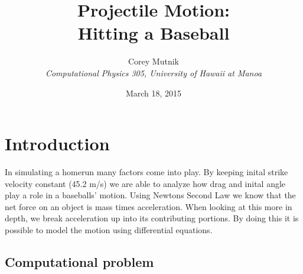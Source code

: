 \documentclass[11pt]{article}
\begin{document}
\pagestyle{myheadings}


\title{Projectile Motion:\\
Hitting a Baseball}


\author{Corey Mutnik \\
{\it Computational Physics 305, University of Hawaii at Manoa} }


\date{March 18, 2015}

\maketitle   





\section{Introduction}


In simulating a homerun many factors come into play.  By keeping inital strike velocity constant (45.2 m/s) we are able to 
analyze how drag and inital angle play a role in a baseballs' motion.  
Using Newtons Second Law we know that the net force on an object 
is mass times acceleration.  When looking at this more in depth, we break acceleration up into its contributing 
portions.  By doing this it is possible to model the motion using differential equations.


\subsection{Computational problem}
\end{document}
